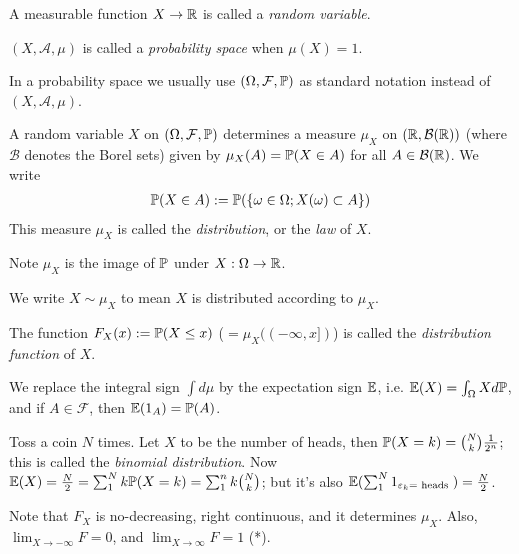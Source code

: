 \documentclass[a4paper]{article}
\begin{document}
\begin{defi}
A measurable function $X \to \R$ is called a \emph{random variable}.
\end{defi}

\begin{defi}
$(X,\mathcal{A},\mu)$ is called a \emph{probability space} when $\mu(X) = 1$.

In a probability space we usually use $(\Omega,\mathcal{F},\P)$ as standard notation instead of $(X,\mathcal{A},\mu)$.
\end{defi}

\begin{defi}
A random variable $X$ on $(\Omega,\mathcal{F},\P)$ determines a measure $\mu_X$ on $(\R,\mathcal{B}(\R))$ (where $\mathcal{B}$ denotes the Borel sets) given by $\mu_X(A) = \P(X \in A)$ for all $A \in \mathcal{B}(\R)$. We write
\begin{equation*}
\begin{aligned}
\P(X \in A): = \P(\{\omega \in \Omega; X(\omega) \subset A\})
\end{aligned}
\end{equation*}
This measure $\mu_X$ is called the \emph{distribution}, or the \emph{law} of $X$.

Note $\mu_X$ is the image of $\P$ under $X: \Omega \to \R$.
\end{defi}

We write $X \sim \mu_X$ to mean $X$ is distributed according to $\mu_X$.

\begin{defi}
The function $F_X(x) := \P(X \leq x)$ ($ = \mu_X((-\infty,x])$) is called the \emph{distribution function} of $X$.
\end{defi}

We replace the integral sign $\int d\mu$ by the expectation sign $\E$, i.e. $\E(X) = \int_\Omega X d\P$, and if $A \in \mathcal{F}$, then $\E(1_A) = \P(A)$.

\begin{eg}
Toss a coin $N$ times. Let $X$ to be the number of heads, then $\P(X=k) = {N \choose k} \frac{1}{2^n}$; this is called the \emph{binomial distribution}. Now $\E(X) = \frac{N}{2} = \sum_1^N k\P(X=k) = \sum_1^n k{N \choose k}$; but it's also $\E(\sum_1^N 1_{\varepsilon_k = \text{ heads }}) = \frac{N}{2}$.
\end{eg}

Note that $F_X$ is no-decreasing, right continuous, and it determines $\mu_X$. Also, $\lim_{X \to -\infty} F = 0$, and $\lim_{X \to \infty} F = 1$ (*).
\end{document}
